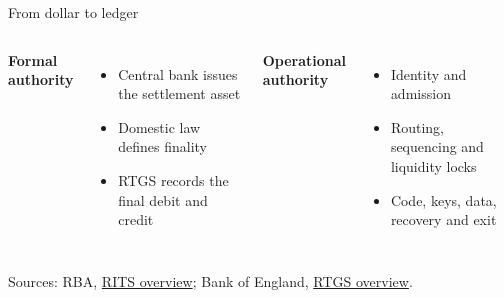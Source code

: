 \documentclass[aspectratio=169,12pt]{beamer}
\newcommand{\rust}[1]{\textcolor{Rust}{\textbf{#1}}}
\newcommand{\blue}[1]{\textcolor{Ocean}{\textbf{#1}}}
\newcommand{\source}[1]{\vfill\par\fontsize{5.4}{6.5}\selectfont\color{Quiet}Sources: #1}
\newcommand{\tightitems}{\setlength{\itemsep}{0.42em}\setlength{\parskip}{0pt}}
\begin{document}
\begin{frame}{From dollar to ledger}
  \vspace{0.30cm}
  \begin{columns}[T,onlytextwidth]
      \rust{Formal authority}
      \begin{itemize}\tightitems
        \item Central bank issues the settlement asset
        \item Domestic law defines finality
        \item RTGS records the final debit and credit
      \end{itemize}
      \blue{Operational authority}
      \begin{itemize}\tightitems
        \item Identity and admission
        \item Routing, sequencing and liquidity locks
        \item Code, keys, data, recovery and exit
      \end{itemize}
  \end{columns}
  \source{RBA, \href{https://www.rba.gov.au/payments-and-infrastructure/rits/about.html}{RITS overview}; Bank of England, \href{https://www.bankofengland.co.uk/payment-and-settlement/a-brief-introduction-to-the-real-time-gross-settlement-system-and-chaps}{RTGS overview}.}
\end{frame}
\end{document}
